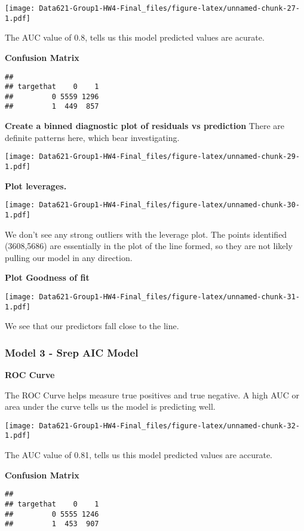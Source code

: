 \documentclass[]{article}
\begin{document}
\texttt{[image: Data621-Group1-HW4-Final\_files/figure-latex/unnamed-chunk-27-1.pdf]}

The AUC value of 0.8, tells us this model predicted values are acurate.

\textbf{Confusion Matrix}

\begin{verbatim}
##          
## targethat    0    1
##         0 5559 1296
##         1  449  857
\end{verbatim}

\textbf{Create a binned diagnostic plot of residuals vs prediction}
There are definite patterns here, which bear investigating.

\texttt{[image: Data621-Group1-HW4-Final\_files/figure-latex/unnamed-chunk-29-1.pdf]}

\textbf{Plot leverages.}

\texttt{[image: Data621-Group1-HW4-Final\_files/figure-latex/unnamed-chunk-30-1.pdf]}

We don't see any strong outliers with the leverage plot. The points
identified (3608,5686) are essentially in the plot of the line formed,
so they are not likely pulling our model in any direction.

\textbf{Plot Goodness of fit}

\texttt{[image: Data621-Group1-HW4-Final\_files/figure-latex/unnamed-chunk-31-1.pdf]}

We see that our predictors fall close to the line.

\hypertarget{model-3---srep-aic-model}{%
\subsubsection{Model 3 - Srep AIC
Model}\label{model-3---srep-aic-model}}

\textbf{ROC Curve}

The ROC Curve helps measure true positives and true negative. A high AUC
or area under the curve tells us the model is predicting well.

\texttt{[image: Data621-Group1-HW4-Final\_files/figure-latex/unnamed-chunk-32-1.pdf]}

The AUC value of 0.81, tells us this model predicted values are
accurate.

\textbf{Confusion Matrix}

\begin{verbatim}
##          
## targethat    0    1
##         0 5555 1246
##         1  453  907
\end{verbatim}
\end{document}
